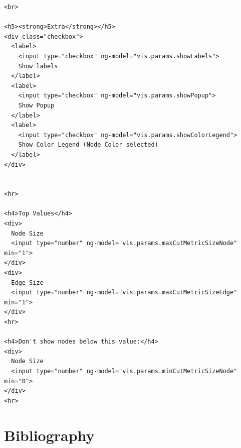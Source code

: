 \documentclass[a4paper, 12pt]{book}
\begin{document}
\begin{lstlisting}[frame=single]
<br>

<h5><strong>Extra</strong></h5>
<div class="checkbox">
  <label>
    <input type="checkbox" ng-model="vis.params.showLabels">
    Show labels
  </label>
  <label>
    <input type="checkbox" ng-model="vis.params.showPopup">
    Show Popup
  </label>
  <label>
    <input type="checkbox" ng-model="vis.params.showColorLegend">
    Show Color Legend (Node Color selected)
  </label>
</div>


<hr>

<h4>Top Values</h4>
<div>
  Node Size
  <input type="number" ng-model="vis.params.maxCutMetricSizeNode" min="1">
</div>
<div>
  Edge Size
  <input type="number" ng-model="vis.params.maxCutMetricSizeEdge" min="1">
</div>
<hr>

<h4>Don't show nodes below this value:</h4>
<div>
  Node Size
  <input type="number" ng-model="vis.params.minCutMetricSizeNode" min="0">
</div>
<hr>

\end{lstlisting}


\chapter{Bibliography}
\label{sec:bib}
\end{document}
